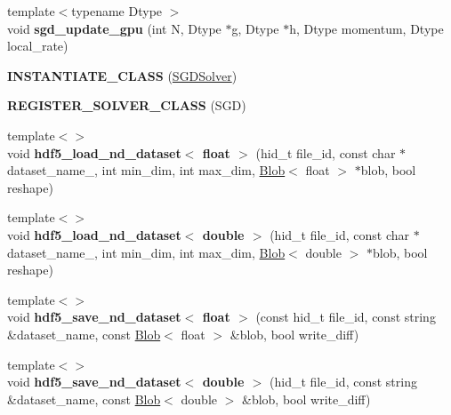 \begin{DoxyCompactItemize}
\item 
{\footnotesize template$<$typename Dtype $>$ }\\void {\bfseries sgd\+\_\+update\+\_\+gpu} (int N, Dtype $\ast$g, Dtype $\ast$h, Dtype momentum, Dtype local\+\_\+rate)\hypertarget{namespacecaffe_a7b52a25aea6e34816f4758e6d12f7feb}{}\label{namespacecaffe_a7b52a25aea6e34816f4758e6d12f7feb}

\item 
{\bfseries I\+N\+S\+T\+A\+N\+T\+I\+A\+T\+E\+\_\+\+C\+L\+A\+SS} (\hyperlink{classcaffe_1_1SGDSolver}{S\+G\+D\+Solver})\hypertarget{namespacecaffe_ab49a0e695d3ff3f6774083c4ed6fe9a3}{}\label{namespacecaffe_ab49a0e695d3ff3f6774083c4ed6fe9a3}

\item 
{\bfseries R\+E\+G\+I\+S\+T\+E\+R\+\_\+\+S\+O\+L\+V\+E\+R\+\_\+\+C\+L\+A\+SS} (S\+GD)\hypertarget{namespacecaffe_a04e510057496d7ef8d16fc71e9ac7ac9}{}\label{namespacecaffe_a04e510057496d7ef8d16fc71e9ac7ac9}

\item 
{\footnotesize template$<$$>$ }\\void {\bfseries hdf5\+\_\+load\+\_\+nd\+\_\+dataset$<$ float $>$} (hid\+\_\+t file\+\_\+id, const char $\ast$dataset\+\_\+name\+\_\+, int min\+\_\+dim, int max\+\_\+dim, \hyperlink{classcaffe_1_1Blob}{Blob}$<$ float $>$ $\ast$blob, bool reshape)\hypertarget{namespacecaffe_a82f7e8e73b156548fa7b90e67024ca1d}{}\label{namespacecaffe_a82f7e8e73b156548fa7b90e67024ca1d}

\item 
{\footnotesize template$<$$>$ }\\void {\bfseries hdf5\+\_\+load\+\_\+nd\+\_\+dataset$<$ double $>$} (hid\+\_\+t file\+\_\+id, const char $\ast$dataset\+\_\+name\+\_\+, int min\+\_\+dim, int max\+\_\+dim, \hyperlink{classcaffe_1_1Blob}{Blob}$<$ double $>$ $\ast$blob, bool reshape)\hypertarget{namespacecaffe_a33e1d4fe0ec40d1186387c7872f4c99d}{}\label{namespacecaffe_a33e1d4fe0ec40d1186387c7872f4c99d}

\item 
{\footnotesize template$<$$>$ }\\void {\bfseries hdf5\+\_\+save\+\_\+nd\+\_\+dataset$<$ float $>$} (const hid\+\_\+t file\+\_\+id, const string \&dataset\+\_\+name, const \hyperlink{classcaffe_1_1Blob}{Blob}$<$ float $>$ \&blob, bool write\+\_\+diff)\hypertarget{namespacecaffe_aea2d44137826e942cabd48bf54abbc21}{}\label{namespacecaffe_aea2d44137826e942cabd48bf54abbc21}

\item 
{\footnotesize template$<$$>$ }\\void {\bfseries hdf5\+\_\+save\+\_\+nd\+\_\+dataset$<$ double $>$} (hid\+\_\+t file\+\_\+id, const string \&dataset\+\_\+name, const \hyperlink{classcaffe_1_1Blob}{Blob}$<$ double $>$ \&blob, bool write\+\_\+diff)\hypertarget{namespacecaffe_a91c74b78f13fb2d6fba4f45ead5480bf}{}\label{namespacecaffe_a91c74b78f13fb2d6fba4f45ead5480bf}


\end{DoxyCompactItemize}
